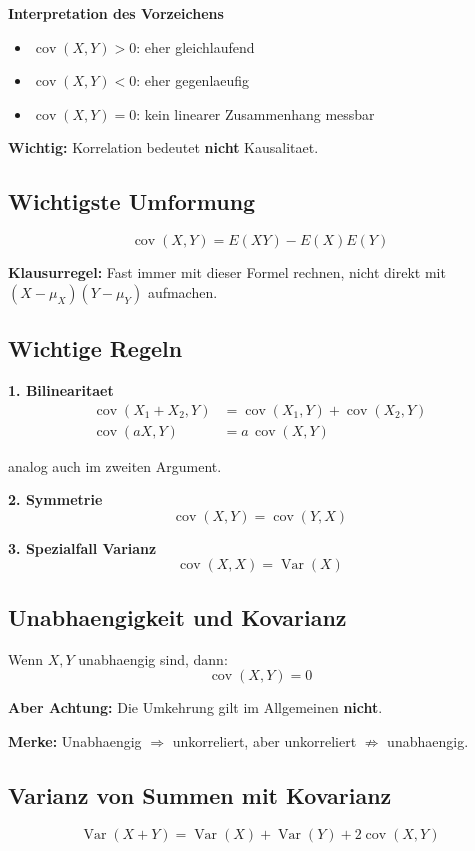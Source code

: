 \documentclass[a4paper,11pt]{article}
\begin{document}
\textbf{Interpretation des Vorzeichens}
\begin{itemize}
  \item $\operatorname{cov}(X,Y)>0$: eher gleichlaufend
  \item $\operatorname{cov}(X,Y)<0$: eher gegenlaeufig
  \item $\operatorname{cov}(X,Y)=0$: kein linearer Zusammenhang messbar
\end{itemize}

\textbf{Wichtig:}
Korrelation bedeutet \textbf{nicht} Kausalitaet.

\subsection{Wichtigste Umformung}
\[
\operatorname{cov}(X,Y)=E(XY)-E(X)E(Y)
\]

\textbf{Klausurregel:}
Fast immer mit dieser Formel rechnen, nicht direkt mit $(X-\mu_X)(Y-\mu_Y)$ aufmachen.

\subsection{Wichtige Regeln}
\textbf{1. Bilinearitaet}
\begin{align*}
\operatorname{cov}(X_1+X_2,Y) &= \operatorname{cov}(X_1,Y)+\operatorname{cov}(X_2,Y) \\
\operatorname{cov}(aX,Y) &= a\,\operatorname{cov}(X,Y)
\end{align*}

analog auch im zweiten Argument.

\textbf{2. Symmetrie}
\[
\operatorname{cov}(X,Y)=\operatorname{cov}(Y,X)
\]

\textbf{3. Spezialfall Varianz}
\[
\operatorname{cov}(X,X)=\operatorname{Var}(X)
\]

\subsection{Unabhaengigkeit und Kovarianz}
Wenn $X,Y$ unabhaengig sind, dann:
\[
\operatorname{cov}(X,Y)=0
\]

\textbf{Aber Achtung:}
Die Umkehrung gilt im Allgemeinen \textbf{nicht}.

\textbf{Merke:}
Unabhaengig $\Rightarrow$ unkorreliert, aber unkorreliert $\nRightarrow$ unabhaengig.

\subsection{Varianz von Summen mit Kovarianz}
\[
\operatorname{Var}(X+Y)=\operatorname{Var}(X)+\operatorname{Var}(Y)+2\operatorname{cov}(X,Y)
\]
\end{document}
